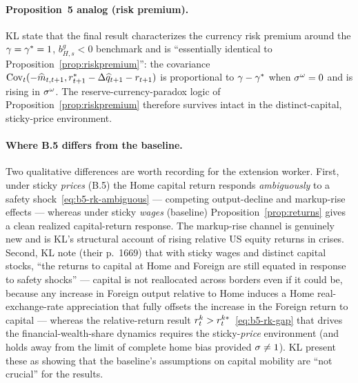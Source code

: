 \paragraph{Proposition~5 analog (risk premium).} KL state that the final result
characterizes the currency risk premium around the $\gamma=\gamma^{*}=1$, $b^g_{H,s}<0$
benchmark and is ``essentially identical to Proposition~\ref{prop:riskpremium}'':
the covariance $\operatorname{Cov}_t(-\widehat{m}_{t,t+1},r^{*}_{t+1}-\Delta\widehat{q}_{t+1}-r_{t+1})$
is proportional to $\gamma-\gamma^{*}$ when $\sigma^{\omega}=0$ and is rising in
$\sigma^{\omega}$. The reserve-currency-paradox logic of
Proposition~\ref{prop:riskpremium} therefore survives intact in the
distinct-capital, sticky-price environment.

\paragraph{Where B.5 differs from the baseline.} Two qualitative differences are
worth recording for the extension worker. First, under sticky \emph{prices} (B.5)
the Home capital return responds \emph{ambiguously} to a safety
shock~\eqref{eq:b5-rk-ambiguous} --- competing output-decline and markup-rise
effects --- whereas under sticky \emph{wages} (baseline)
Proposition~\ref{prop:returns} gives a clean realized capital-return response. The
markup-rise channel is genuinely new and is KL's structural account of rising
relative US equity returns in crises. Second, KL note (their p.~1669) that with
sticky wages and distinct capital stocks, ``the returns to capital at Home and
Foreign are still equated in response to safety shocks'' --- capital is not
reallocated across borders even if it could be, because any increase in Foreign
output relative to Home induces a Home real-exchange-rate appreciation that fully
offsets the increase in the Foreign return to capital --- whereas the
relative-return result $r^{k}_t>r^{k*}_t$~\eqref{eq:b5-rk-gap} that drives the
financial-wealth-share dynamics requires the sticky-\emph{price} environment (and
holds away from the limit of complete home bias provided $\sigma\neq1$). KL present
these as showing that the baseline's assumptions on capital mobility are ``not
crucial'' for the results.
